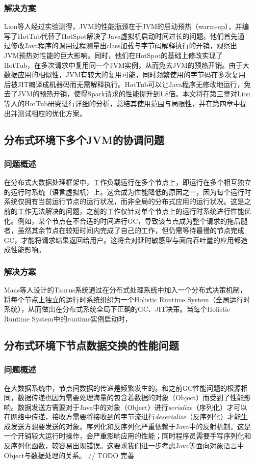 \documentclass[lang=cn,11pt,a4paper,cite=authoryear]{elegantpaper}
\begin{document}
\subsubsection{解决方案}
Lion等人经过实验测得，JVM的性能瓶颈在于JVM的启动预热（warm-up），并编写了HotTub代替了HotSpot\cite{DBLP:conf/osdi/LionCSZGY16}解决了Java虚拟机启动时间过长的问题。他们首先通过修改Java程序的调用过程测量出class加载与字节码解释执行的开销，观察出JVM预热对性能的巨大影响。同时，他们在HotSpot的基础上修改实现了HotTub，在多次请求中复用同一个JVM实例，从而免去JVM的预热开销。由于大数据应用的相似性，JVM有较大的复用可能，同时频繁使用的字节码在多次复用后被JIT编译成机器码而无需解释执行。HotTub可以让Java程序无修改地运行，免去了JVM的预热开销，使得Spark请求的性能提升到1.8倍。本文将在第三章对Lion等人的HotTub研究进行详细的分析，总结其使用范围与局限性，并在第四章中提出并测试相应的优化方案。

\subsection{分布式环境下多个JVM的协调问题}
\subsubsection{问题概述}
在分布式大数据处理框架中，工作负载运行在多个节点上，即运行在多个相互独立的运行时系统（语言虚拟机）上。这会成为性能降低的原因之一，因为每个运行时系统仅拥有当前运行节点的运行状况，而非全局的分布式应用的运行状况。这是之前的工作无法解决的问题，之前的工作仅针对单个节点上的运行时系统进行性能优化。例如，某个节点在不合适的时间进行GC，导致该节点成为整个请求的拖后腿者，虽然其余节点在较短时间内完成了自己的工作，但仍需等待最慢的节点完成GC，才能将请求结果返回给用户。这将会对延时敏感型与面向吞吐量的应用都造成性能影响。
\subsubsection{解决方案}
Maas等人设计的Taurus\cite{DBLP:conf/asplos/MaasA0K16}系统通过在分布式处理系统中加入一个分布式决策机制，将每个节点上独立的运行时系统组织为一个Holistic Runtime System（全局运行时系统），从而做出在分布式系统全局下正确的GC、JIT决策。当每个Holistic Runtime System中的runtime实例启动时，

\subsection{分布式环境下节点数据交换的性能问题}
\subsubsection{问题概述}
在大数据系统中，节点间数据的传递是频繁发生的。和之前GC性能问题的根源相同，数据传递也因为需要处理海量的包含着数据的对象（Object）而受到了性能影响。数据发送方需要对于Java中的对象（Object）进行\textit{serialize}（序列化）才可以在网络中传递，接收方需要将接收到的字节流进行\textit{deserialize}（反序列化）才能生成发送方想要发送的对象。序列化和反序列化严重依赖于Java中的反射机制，这是一个开销较大运行时操作，会严重影响应用的性能；同时程序员需要手写序列化和反序列化函数，较容易出现错误。这要求我们进一步考虑Java等面向对象语言中Object与数据处理的关系。
// TODO 完善
\end{document}
